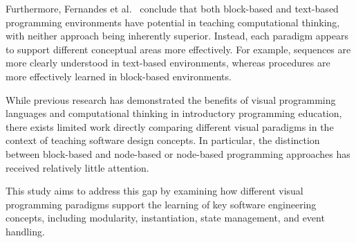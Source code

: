 Furthermore, Fernandes et al.~\cite{fernandes_blocks_2026} conclude that both block-based and text-based programming environments have potential in teaching computational thinking, with neither approach being inherently superior.
Instead, each paradigm appears to support different conceptual areas more effectively.
For example, sequences are more clearly understood in text-based environments, whereas procedures are more effectively learned in block-based environments.

While previous research has demonstrated the benefits of visual programming languages and computational thinking in introductory programming education, there exists limited work directly comparing different visual paradigms in the context of teaching software design concepts.
In particular, the distinction between block-based and node-based or node-based programming approaches has received relatively little attention.

This study aims to address this gap by examining how different visual programming paradigms support the learning of key software engineering concepts, including modularity, instantiation, state management, and event handling.


